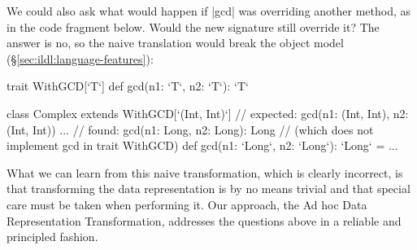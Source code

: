 We could also ask what would happen if |gcd| was overriding another method, as in the code fragment below. Would the new signature still override it? The answer is no, so the naive translation would break the object model (\S\ref{sec:ildl:language-features}):

\begin{lstlisting-nobreak}
trait WithGCD[`T`] {
  def gcd(n1: `T`, n2: `T`): `T`
}
\end{lstlisting-nobreak}


\begin{lstlisting-nobreak}
class Complex extends WithGCD[`(Int, Int)`] {
  // expected: gcd(n1: (Int, Int), n2: (Int, Int)) ...
  // found:    gcd(n1: Long, n2: Long): Long
  // (which does not implement gcd in trait WithGCD)
  def gcd(n1: `Long`, n2: `Long`): `Long` = ...
}
\end{lstlisting-nobreak}

What we can learn from this naive transformation, which is clearly incorrect, is that transforming the data representation is by no means trivial and that special care must be taken when performing it. Our approach, the Ad hoc Data Representation Transformation, addresses the questions above in a reliable and principled fashion.

